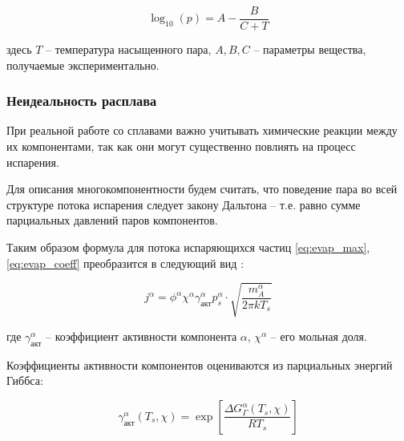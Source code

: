 \begin{equation}
    \log_{10}(p) = A - \frac{B}{C + T}
\end{equation}

\noindent
здесь $T$ -- температура насыщенного пара, $A, B, C$ -- параметры вещества, получаемые экспериментально.

\subsubsection{Неидеальность расплава}

При реальной работе со сплавами важно учитывать химические реакции между их компонентами, так как они могут существенно повлиять на процесс испарения.

Для описания многокомпонентности будем считать, что поведение пара во всей структуре потока испарения следует закону Дальтона -- т.е. равно сумме парциальных давлений паров компонентов.

Таким образом формула для потока испаряющихся частиц \ref{eq:evap_max}, \ref{eq:evap_coeff} преобразится в следующий вид \cite{klassen2018simulation}:

\begin{equation}
\label{eq:evap_multicomp_flow}
    j^{\alpha} = \phi^\alpha\chi^\alpha\gamma_{\text{акт}}^\alpha p^{\alpha}_s \cdot \sqrt{\frac{m_A^\alpha}{2\pi k T_s}}
\end{equation}

\noindent
где $\gamma_{\text{акт}}^\alpha$ -- коэффициент активности компонента $\alpha$, $\chi^\alpha$ -- его мольная доля.

Коэффициенты активности компонентов оцениваются из парциальных энергий Гиббса:

\begin{equation}
    \gamma_{\text{акт}}^\alpha(T_s, \chi) = \exp\left[ \frac{\Delta G^\alpha_\Gamma (T_s, \chi)}{RT_s} \right]
\end{equation}

